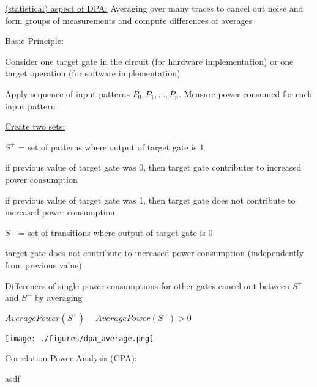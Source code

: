 \documentclass[landscape, a4paper]{article}
\begin{document}
\begin{minipage}[t]{0.2\pagewidth}
\begin{betterlist}
\begin{betterlist}
\begin{betterlist}
				\item \underline{(statistical) aspect of DPA:} \alert{Averaging} over many traces to cancel out noise and \alert{form groups of measurements} and compute differences of averages
				\item \underline{Basic Principle:}
				\begin{betterlist}
					\item Consider one target gate in the circuit (for hardware implementation) or one target operation (for software implementation)
					\item Apply sequence of input patterns $P_0, P_1, \ldots, P_n$. Measure power consumed for each input pattern
					\item \underline{Create two sets:}
					\begin{betterlist}
						\item $S^+$ = set of patterns where output of target gate is $1$
						\begin{betterlist}
							\item if previous value of target gate was 0, then target gate contributes to increased power consumption
							\item if previous value of target gate was 1, then target gate does not contribute to increased power consumption
						\end{betterlist}
						\item $S^−$ = set of transitions where output of target gate is $0$
						\begin{betterlist}
							\item target gate does not contribute to increased power consumption (independently from previous value)
						\end{betterlist}
					\end{betterlist}
          \item Differences of single power consumptions for other gates cancel out between $S^+$ and $S^−$ by averaging
					\item $AveragePower(S^+) - AveragePower(S^−) > 0$
				\end{betterlist}
        \texttt{[image: ./figures/dpa\_average.png]} 
			\end{betterlist}
			\item \alert{Correlation Power Analysis (CPA):}
			\begin{betterlist}
				\item asdf
			\end{betterlist}
		\end{betterlist}

\end{betterlist}
\end{minipage}
\end{document}
